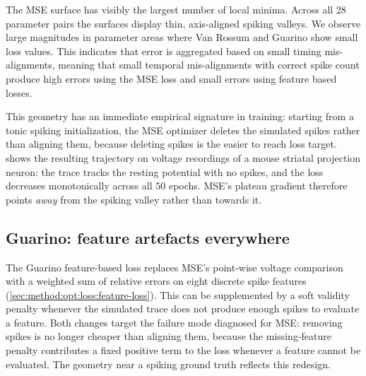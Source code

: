 The \gls{MSE} surface has visibly the largest number of local minima.
Across all 28 parameter pairs the surfaces display thin, axis-aligned spiking valleys.
We observe large magnitudes in parameter areas where Van Rossum and Guarino show small loss values.
This indicates that error is aggregated based on small timing mis-alignments,
meaning that small temporal mis-alignments with correct spike count produce high errors using the \gls{MSE} loss and small errors using feature based losses.

This geometry has an immediate empirical signature in training: starting from a tonic spiking initialization, the \gls{MSE} optimizer deletes the simulated spikes rather than aligning them, because deleting spikes is the easier to reach loss target.
 shows the resulting trajectory on voltage recordings of a mouse striatal projection neuron:
the trace tracks the resting potential with no spikes, and the loss decreases monotonically across all $50$ epochs.
\gls{MSE}'s plateau gradient therefore points \emph{away} from the spiking valley rather than towards it.

\subsection{Guarino: feature artefacts everywhere}\label{sec:results:landscape:guarino}

The Guarino feature-based loss replaces \gls{MSE}'s point-wise voltage comparison with a weighted sum of relative errors on eight discrete spike features (\cref{sec:method:opt:loss:feature-loss}).
This can be supplemented by a soft validity penalty whenever the simulated trace does not produce enough spikes to evaluate a feature.
Both changes target the failure mode diagnosed for \gls{MSE}: removing spikes is no longer cheaper than aligning them, because the missing-feature penalty contributes a fixed positive term to the loss whenever a feature cannot be evaluated.
The geometry near a spiking ground truth reflects this redesign.

